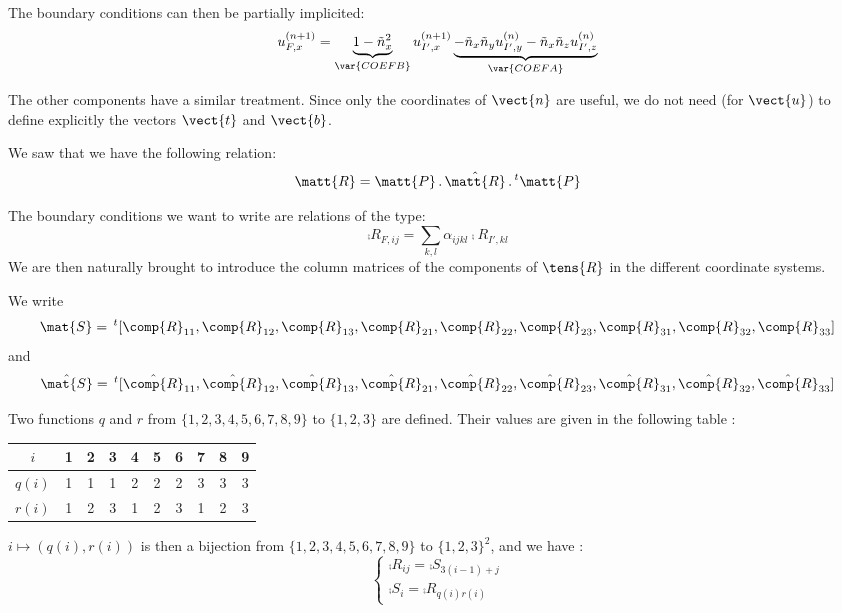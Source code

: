 The boundary conditions can then be partially implicited:
\begin{equation}
\label{Base_Clsyvt_eq_clU}
u_{F,x}^{(n+1)} = \underbrace{1-\tilde{n}_x^2}_{\var{COEFB}}u_{I',x}^{(n+1)}
\underbrace{-\tilde{n}_x\tilde{n}_y u_{I',y}^{(n)}
-\tilde{n}_x\tilde{n}_z u_{I',z}^{(n)}}_{\var{COEFA}}
\end{equation}

The other components have a similar treatment. Since only the coordinates
of $\vect{n}$ are useful, we do not need (for $\vect{u}$) to define
explicitly the vectors  $\vect{t}$ and $\vect{b}$.

\vspace{1cm}
We saw that we have the following relation:
\begin{equation}
\label{Base_Clsyvt_eq_chgtrepR}
\matt{R}= \matt{P}\,.\,\hat{\matt{R}}\,.\,^t\matt{P}
\end{equation}

The boundary conditions we want to write are relations of the type:
\begin{equation}
\comp{R}_{F,ij}=\sum_{k,l}\alpha_{ijkl}\comp{R}_{I',kl}
\end{equation}
We are then naturally brought to introduce the column matrices of the
components of $\tens{R}$ in the different coordinate systems.

We write
\begin{equation}
\mat{S}=\,^t[\comp{R}_{11},\comp{R}_{12},\comp{R}_{13},
\comp{R}_{21},\comp{R}_{22},\comp{R}_{23},
\comp{R}_{31},\comp{R}_{32},\comp{R}_{33}]
\end{equation}
and
\begin{equation}
\hat{\mat{S}}=\,^t[\hat{\comp{R}}_{11},\hat{\comp{R}}_{12},\hat{\comp{R}}_{13},
\hat{\comp{R}}_{21},\hat{\comp{R}}_{22},\hat{\comp{R}}_{23},
\hat{\comp{R}}_{31},\hat{\comp{R}}_{32},\hat{\comp{R}}_{33}]
\end{equation}

Two functions $q$ and $r$ from $\{1,2,3,4,5,6,7,8,9\}$ to
$\{1,2,3\}$ are defined. Their values are given in the following table :
\begin{center}
\begin{tabular}{|c|c|c|c|c|c|c|c|c|c|}
\hline
$i$&1&2&3&4&5&6&7&8&9\\
\hline
$q(i)$&1&1&1&2&2&2&3&3&3\\
\hline
$r(i)$&1&2&3&1&2&3&1&2&3\\
\hline
\end{tabular}
\end{center}
$i\longmapsto (q(i),r(i))$ is then a bijection from $\{1,2,3,4,5,6,7,8,9\}$
to $\{1,2,3\}^2$, and we have :
\begin{equation}
\left\{\begin{array}{l}
\comp{R}_{ij}=\comp{S}_{3(i-1)+j}\\
\comp{S}_i=\comp{R}_{q(i)r(i)}
\end{array}\right.
\end{equation}

